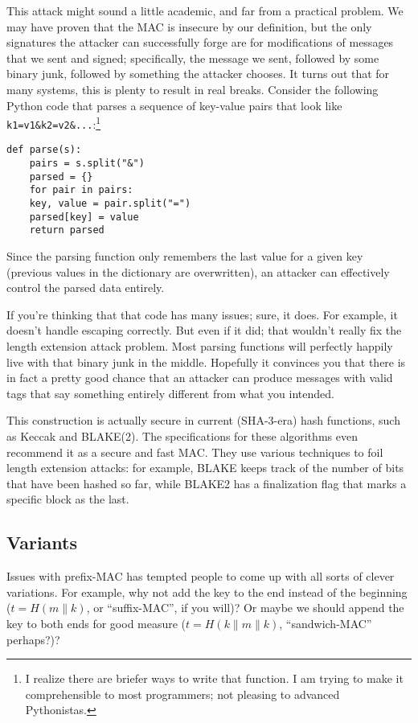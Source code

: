 \documentclass[11pt,ebook,table,dvipsnames]{memoir}
\begin{document}
This attack might sound a little academic, and far from a practical
problem. We may have proven that the MAC is insecure by our
definition, but the only signatures the attacker can successfully
forge are for modifications of messages that we sent and signed;
specifically, the message we sent, followed by some binary junk,
followed by something the attacker chooses. It turns out that for many
systems, this is plenty to result in real breaks. Consider the
following Python code that parses a sequence of key-value pairs that
look like \verb~k1=v1&k2=v2&...~:\footnote{I realize there are briefer ways to
write that function. I am trying to make it comprehensible to most
programmers; not pleasing to advanced Pythonistas.}

\begin{verbatim}
def parse(s):
    pairs = s.split("&")
    parsed = {}
    for pair in pairs:
	key, value = pair.split("=")
	parsed[key] = value
    return parsed
\end{verbatim}

Since the parsing function only remembers the last value for a given
key (previous values in the dictionary are overwritten), an attacker
can effectively control the parsed data entirely.

If you're thinking that that code has many issues; sure, it does. For
example, it doesn't handle escaping correctly. But even if it did;
that wouldn't really fix the length extension attack problem. Most
parsing functions will perfectly happily live with that binary junk in
the middle. Hopefully it convinces you that there is in fact a pretty
good chance that an attacker can produce messages with valid tags that
say something entirely different from what you intended.

This construction is actually secure in current (SHA-3-era) hash
functions, such as Keccak and BLAKE(2). The specifications for these
algorithms even recommend it as a secure and fast MAC. They use
various techniques to foil length extension attacks: for example,
BLAKE keeps track of the number of bits that have been hashed so far,
while BLAKE2 has a finalization flag that marks a specific block as
the last.
\subsection{Variants}
\label{sec-2-7-3-2}

Issues with prefix-MAC has tempted people to come up with all sorts of
clever variations. For example, why not add the key to the end instead
of the beginning ($t = H(m \| k)$, or \enquote{suffix-MAC}, if you will)? Or
maybe we should append the key to both ends for good measure ($t = H(k
\| m \| k)$, \enquote{sandwich-MAC} perhaps?)?
\end{document}

